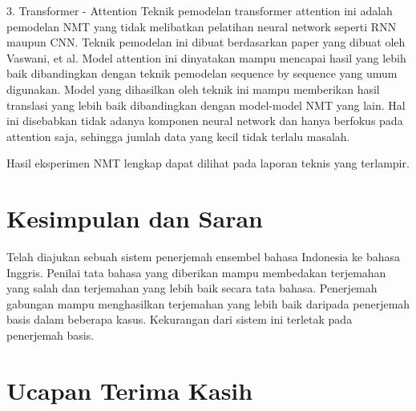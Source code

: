 \documentclass[conference]{IEEEtran}
\begin{document}
3. Transformer - Attention
Teknik pemodelan transformer attention ini adalah pemodelan NMT yang tidak melibatkan pelatihan neural network seperti RNN maupun CNN. Teknik pemodelan ini dibuat berdasarkan paper yang dibuat oleh Vaswani, et al. Model attention ini dinyatakan mampu mencapai hasil yang lebih baik dibandingkan dengan teknik pemodelan sequence by sequence yang umum digunakan. Model yang dihasilkan oleh teknik ini mampu memberikan hasil translasi yang lebih baik dibandingkan dengan model-model NMT yang lain. Hal ini disebabkan tidak adanya komponen neural network dan hanya berfokus pada attention saja, sehingga jumlah data yang kecil tidak terlalu masalah.

Hasil eksperimen NMT lengkap dapat dilihat pada laporan teknis yang terlampir.

\section{Kesimpulan dan Saran}

Telah diajukan sebuah sistem penerjemah ensembel bahasa Indonesia ke bahasa Inggris. Penilai tata bahasa yang diberikan mampu membedakan terjemahan yang salah dan terjemahan yang lebih baik secara tata bahasa. Penerjemah gabungan mampu menghasilkan terjemahan yang lebih baik daripada penerjemah basis dalam beberapa kasus. Kekurangan dari sistem ini terletak pada penerjemah basis.

\section*{Ucapan Terima Kasih}
\end{document}
